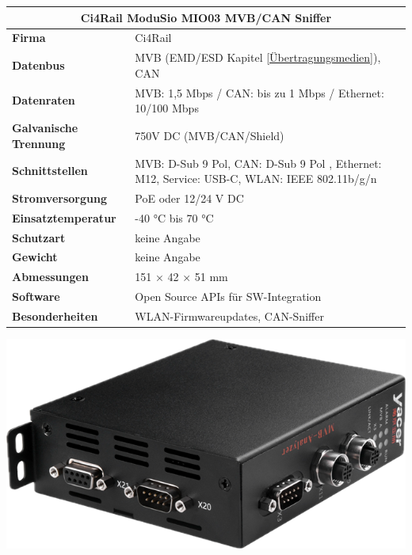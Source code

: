 \begin{minipage}{0.57\textwidth}
  \begin{tabular}{|m{3.3cm}|m{4.2cm}|}
   \hline
   \multicolumn{2}{|c|}{\textbf{Ci4Rail ModuSio MIO03 MVB/CAN Sniffer}} \\ \hline
    \textbf{Firma} & Ci4Rail \\ \hline
    \textbf{Datenbus} & MVB (EMD/ESD Kapitel \ref{Übertragungsmedien}), CAN \\ \hline
    \textbf{Datenraten} & MVB: 1,5 Mbps / CAN: bis zu 1 Mbps / Ethernet: 10/100 Mbps \\ \hline
    \textbf{Galvanische \mbox{Trennung}} & 750V DC (MVB/CAN/Shield) \\ \hline
    \textbf{Schnittstellen} & MVB: D-Sub 9 Pol, CAN: D-Sub 9 Pol , Ethernet: M12, Service: USB-C, WLAN: IEEE 802.11b/g/n  \\ \hline
    \textbf{Stromversorgung} & PoE oder 12/24 V DC \\ \hline
    \textbf{Einsatztemperatur} & -40 °C bis 70 °C \\ \hline
    \textbf{Schutzart} & keine Angabe \\ \hline
    \textbf{Gewicht} & keine Angabe \\ \hline
    \textbf{Abmessungen} & 151 × 42 × 51 mm \\ \hline
    \textbf{Software} &  Open Source APIs für SW-Integration \\ \hline
    \textbf{Besonderheiten} & WLAN-Firmwareupdates, CAN-Sniffer \\ \hline
  \end{tabular}

\end{minipage}
\vspace{0.3cm}
\begin{minipage}{0.4\textwidth}
  \includegraphics[width=1\linewidth]{Figures/Chap3/Konkurenz/Yacer.png}
  \label{fig:YacerAnalyzer}
\end{minipage}
